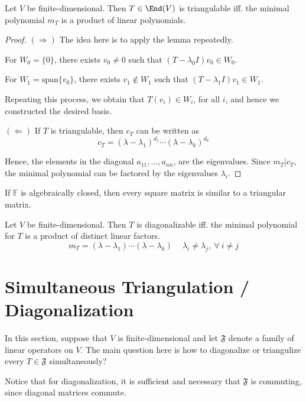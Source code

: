 \begin{theorem}
	Let $V$ be finite-dimensional. Then $T \in \End(V)$ is triangulable iff. the minimal polynomial $m_T$ is a product of linear polynomials.
\end{theorem}

\begin{proof}
	$(\Rightarrow)$ The idea here is to apply the lemma repeatedly.

	For $W_0 = \{ 0 \}$, there exists $v_0 \neq 0$ such that $(T - \lambda_0 I)v_0 \in W_0$.

	For $W_1 = \text{span}\{ v_0 \}$, there exists $v_1 \notin W_1$ such that $(T - \lambda_1 I)v_1 \in W_1$.

	Repeating this process, we obtain that $T(v_i) \in W_i$, for all $i$, and hence we constructed the desired basis. 

	$(\Leftarrow)$ If $T$ is triangulable, then $c_T$ can be written as
	\[
		c_T = (\lambda - \lambda_1)^{d_1} \cdots (\lambda - \lambda_k)^{d_k}
	\]

	Hence, the elements in the diagonal $a_{11}, \ldots, a_{nn}$, are the eigenvalues. Since $m_T | c_T$, the minimal polynomial can be factored by the eigenvalues $\lambda_i$.
\end{proof}

\begin{corollary}
	If $\mathbb{F}$ is algebraically closed, then every square matrix is similar to a triangular matrix.
\end{corollary}

\begin{theorem}
	Let $V$ be finite-dimensional. Then $T$ is diagonalizable iff. the minimal polynomial for $T$ is a product of distinct linear factors.
	\[
		m_T = (\lambda - \lambda_1) \cdots (\lambda - \lambda_k) \quad ~\lambda_i \neq \lambda_j, ~\forall~i \neq j
	\]
\end{theorem}

\section{Simultaneous Triangulation / Diagonalization}

In this section, suppose that $V$ is finite-dimensional and let $\mathfrak{F}$ denote a family of linear operators on $V$. The main question here is how to diagonalize or triangulize every $T \in \mathfrak{F}$ simultaneously?

Notice that for diagonalization, it is sufficient and necessary that $\mathfrak{F}$ is commuting, since diagonal matrices commute.

